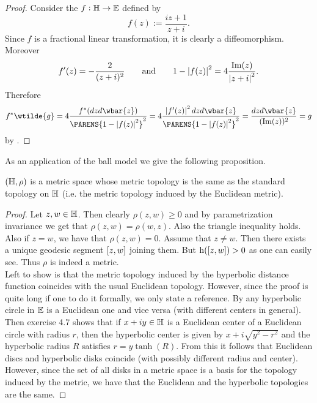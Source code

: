 \begin{proof}
	Consider the  $f : \mathbb{H} \to \mathbb{E}$ defined by 
	\begin{equation}
		f(z) := \frac{iz + 1}{z + i}.
	\end{equation}
	Since $f$ is a fractional linear transformation, it is clearly a diffeomorphism. Moreover
	\begin{equation*}
		f'(z) = -\frac{2}{(z + i)^2} \qquad \text{and} \qquad 1 - \abs[0]{f(z)}^2 = 4\frac{\Im(z)}{\abs[0]{z + i}^2}.	
	\end{equation*}
	Therefore
	\begin{equation*}
		f^*\wtilde{g} = 4 \frac{f^*(dzd\wbar{z})}{\PARENS{1 - \abs[0]{f(z)}^2}^2} = 4 \frac{\abs[0]{f'(z)}^2dzd\wbar{z}}{\PARENS{1 - \abs[0]{f(z)}^2}^2} = \frac{dzd\wbar{z}}{(\Im(z))^2} = g
	\end{equation*}
	\noindent by \cite[41]{lee:Riemannian_manifolds:1997}.
\end{proof}

As an application of the ball model we give the following proposition.

\begin{proposition}
$(\mathbb{H},\rho)$ is a metric space whose metric topology is the same as the standard topology on $\mathbb{H}$ (i.e. the metric topology induced by the Euclidean metric).
\label{prop:metric}
\end{proposition}

\begin{proof}
Let $z,w \in \mathbb{H}$. Then clearly $\rho(z,w) \geq 0$ and by parametrization invariance we get that $\rho(z,w) = \rho(w,z)$. Also the triangle inequality holds. Also if $z = w$, we have that $\rho(z,w) = 0$. Assume that $z \neq w$. Then there exists a unique geodesic segment $\sbr[0]{z,w}$ joining them. But $\h(\sbr[0]{z,w}) > 0$ as one can easily see. Thus $\rho$ is indeed a metric.\\
Left to show is that the metric topology induced by the hyperbolic distance function coincides with the usual Euclidean topology. However, since the proof is quite long if one to do it formally, we only state a reference. By \cite[127]{anderson:hyperbolic_geometry:2005} any hyperbolic circle in $\mathbb{E}$ is a Euclidean one and vice versa (with different centers in general). Then exercise 4.7 \cite[129]{anderson:hyperbolic_geometry:2005} shows that if $x + iy \in \mathbb{H}$ is a Euclidean center of a Euclidean circle with radius $r$, then the hyperbolic center is given by $x + i \sqrt{y^2 - r^2}$ and the hyperbolic radius $R$ satisfies $r = y \tanh(R)$. From this it follows that Euclidean discs and hyperbolic disks coincide (with possibly different radius and center). However, since the set of all disks in a metric space is a basis for the topology induced by the metric, we have that the Euclidean and the hyperbolic topologies are the same.
\end{proof}

